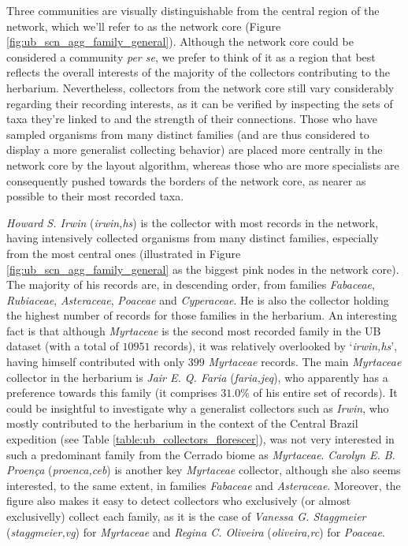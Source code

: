 Three communities are visually distinguishable from the central region of the network, which we'll refer to as the network core (Figure \ref{fig:ub_scn_agg_family_general}).
Although the network core could be considered a community \textit{per se}, we prefer to think of it as a region that best reflects the overall interests of the majority of the collectors contributing to the herbarium.
Nevertheless, collectors from the network core still vary considerably regarding their recording interests, as it can be verified by inspecting the sets of taxa they're linked to and the strength of their connections. 
Those who have sampled organisms from many distinct families (and are thus considered to display a more generalist collecting behavior) are placed more centrally in the network core by the layout algorithm, whereas those who are more specialists are consequently pushed towards the borders of the network core, as nearer as possible to their most recorded taxa.

\textit{Howard S. Irwin} (\textit{irwin,hs}) is the collector with most records in the network, having intensively collected organisms from many distinct families, especially from the most central ones (illustrated in Figure \ref{fig:ub_scn_agg_family_general} as the biggest pink nodes in the network core).
The majority of his records are, in descending order, from families \textit{Fabaceae}, \textit{Rubiaceae}, \textit{Asteraceae}, \textit{Poaceae} and \textit{Cyperaceae}. 
He is also the collector holding the highest number of records for those families in the herbarium.
An interesting fact is that although \textit{Myrtaceae} is the second most recorded family in the UB dataset (with a total of $10951$ records), it was relatively overlooked by `\textit{irwin,hs}', having himself contributed with only $399$ \textit{Myrtaceae} records. 
The main \textit{Myrtaceae} collector in the herbarium is \textit{Jair E. Q. Faria} (\textit{faria,jeq}), who apparently has a preference towards this family (it comprises $31.0\%$ of his entire set of records). 
It could be insightful to investigate why a generalist collectors such as \textit{Irwin}, who mostly contributed to the herbarium in the context of the Central Brazil expedition (see Table \ref{table:ub_collectors_florescer}), was not very interested in such a predominant family from the Cerrado biome as \textit{Myrtaceae}.
\textit{Carolyn E. B. Proença} (\textit{proenca,ceb}) is another key \textit{Myrtaceae} collector, although she also seems interested, to the same extent, in families \textit{Fabaceae} and \textit{Asteraceae}. 
Moreover, the figure also makes it easy to detect collectors who exclusively (or almost exclusivelly) collect each family, as it is the case of \textit{Vanessa G. Staggmeier} (\textit{staggmeier,vg}) for \textit{Myrtaceae} and \textit{Regina C. Oliveira} (\textit{oliveira,rc}) for \textit{Poaceae}.

